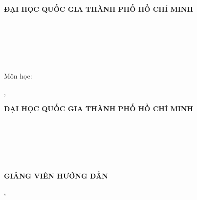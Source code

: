 \begin{titlepage}
\centering\singlespacing
{\large\textbf{ĐẠI HỌC QUỐC GIA THÀNH PHỐ HỒ CHÍ MINH}}\\[2pt]
{\large\textbf{\truong}}\\[2pt]
{\large\textbf{\khoa}}\\[1.2cm]

{\large\textbf{\dssinhvien}}\\[2.2cm]

{\Large\textbf{\tendetai}}\\[0.8cm]
{\normalsize\itshape\tendetaienglish}\\[2.2cm]

{\Large\textbf{\loaibaocao}}\\[4pt]
{\large Môn học: \monhoc}\\[4pt]
{\large\textbf{\chuongtrinh}}

\vfill
{\large\thanhpho, \thangnam}
\end{titlepage}

\begin{titlepage}
\centering\singlespacing
{\large\textbf{ĐẠI HỌC QUỐC GIA THÀNH PHỐ HỒ CHÍ MINH}}\\[2pt]
{\large\textbf{\truong}}\\[2pt]
{\large\textbf{\khoa}}\\[1.2cm]

{\large\textbf{\dssinhvien}}\\[2.2cm]

{\Large\textbf{\tendetai}}\\[2.2cm]

{\Large\textbf{\loaibaocao}}\\[4pt]
{\large\textbf{\chuongtrinh}}\\[1.5cm]

{\large\textbf{GIẢNG VIÊN HƯỚNG DẪN}}\\[4pt]
{\large\dsgvhd}

\vfill
{\large\thanhpho, \thangnam}
\end{titlepage}
